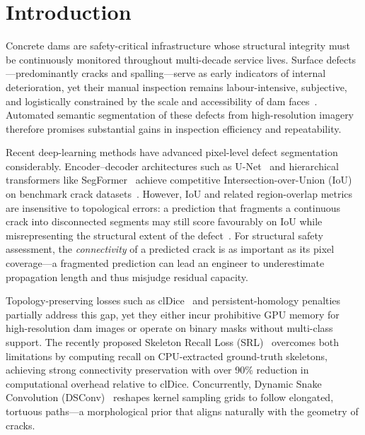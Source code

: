 
\section{Introduction}
\label{sec:intro}

Concrete dams are safety-critical infrastructure whose structural integrity must be continuously monitored throughout multi-decade service lives.
Surface defects---predominantly cracks and spalling---serve as early indicators of internal deterioration, yet their manual inspection remains labour-intensive, subjective, and logistically constrained by the scale and accessibility of dam faces~\cite{chen2024damsurvey,fang2024dam}.
Automated semantic segmentation of these defects from high-resolution imagery therefore promises substantial gains in inspection efficiency and repeatability.

Recent deep-learning methods have advanced pixel-level defect segmentation considerably.
Encoder--decoder architectures such as U-Net~\cite{ronneberger2015unet} and hierarchical transformers like SegFormer~\cite{xie2021segformer} achieve competitive Intersection-over-Union (IoU) on benchmark crack datasets~\cite{zou2019deepcrack,liu2019deepcrack}.
However, IoU and related region-overlap metrics are insensitive to topological errors: a prediction that fragments a continuous crack into disconnected segments may still score favourably on IoU while misrepresenting the structural extent of the defect~\cite{pantoja2024cracktopology}.
For structural safety assessment, the \emph{connectivity} of a predicted crack is as important as its pixel coverage---a fragmented prediction can lead an engineer to underestimate propagation length and thus misjudge residual capacity.

Topology-preserving losses such as clDice~\cite{shit2021cldice} and persistent-homology penalties~\cite{hu2019topology,clough2020topological} partially address this gap, yet they either incur prohibitive GPU memory for high-resolution dam images or operate on binary masks without multi-class support.
The recently proposed Skeleton Recall Loss (SRL)~\cite{shit2024skeleton} overcomes both limitations by computing recall on CPU-extracted ground-truth skeletons, achieving strong connectivity preservation with over 90\% reduction in computational overhead relative to clDice.
Concurrently, Dynamic Snake Convolution (DSConv)~\cite{qi2023dynamic} reshapes kernel sampling grids to follow elongated, tortuous paths---a morphological prior that aligns naturally with the geometry of cracks.


